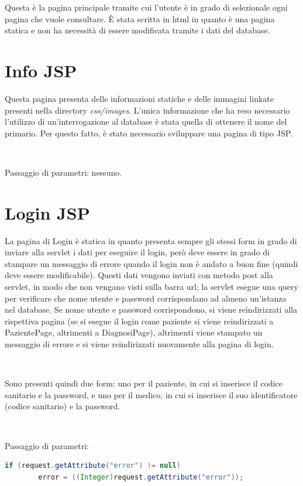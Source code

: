 \documentclass[a4paper,titlepage]{article}
\begin{document}
Questa è la pagina principale tramite cui l'utente è in grado di selezionale ogni pagina che vuole consultare. È stata scritta in html in quanto è una pagina statica e non ha necessità di essere modificata tramite i dati del database.

\section{Info JSP}

Questa pagina presenta delle informazioni statiche e delle immagini linkate presenti nella directory \textit{css/images}. L'unica informazione che ha reso necessario l'utilizzo di un'interrogazione al database è stata quella di ottenere il nome del primario. Per questo fatto, è stato necessario sviluppare una pagina di tipo JSP.

~

Passaggio di parametri: nessuno.

\section{Login JSP}

La pagina di Login è statica in quanto presenta sempre gli stessi form in grado di inviare alla servlet i dati per eseguire il login, però deve essere in grado di stampare un messaggio di errore quando il login non è andato a buon fine (quindi deve essere modificabile). Questi dati vengono inviati con metodo post alla servlet, in modo che non vengano visti sulla barra url; la servlet esegue una query per verificare che nome utente e password corrispondano ad almeno un'istanza nel database. Se nome utente e password corrispondono, si viene reindirizzati alla rispettiva pagina (se si esegue il login come paziente si viene reindirizzati a PazientePage, altrimenti a DiagnosiPage), altrimenti viene stampato un messaggio di errore e si viene reindirizzati nuovamente alla pagina di login.

~

Sono presenti quindi due form: uno per il paziente, in cui si inserisce il codice sanitario e la password, e uno per il medico, in cui si inserisce il suo identificatore (codice sanitario) e la password.


~

Passaggio di parametri: 

\begin{lstlisting}[language=java]
	 if (request.getAttribute("error") != null)
 		error = ((Integer)request.getAttribute("error"));
\end{lstlisting}
\end{document}
